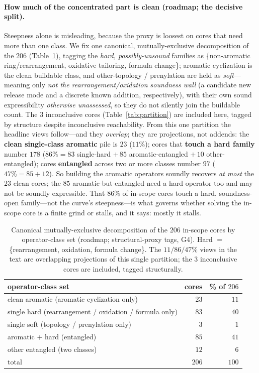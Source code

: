 \documentclass[11pt]{article}
\begin{document}
\paragraph{How much of the concentrated part is clean (roadmap; the decisive split).} Steepness alone
is misleading, because the proxy is loosest on cores that need more than one class. We fix one
canonical, mutually-exclusive decomposition of the $206$ (Table~\ref{tab:mece}), tagging the
\emph{hard, possibly-unsound} families as \{non-aromatic ring/rearrangement, oxidative tailoring,
formula change\}; aromatic cyclization is the clean buildable class, and other-topology / prenylation
are held as \emph{soft}---meaning only \emph{not the rearrangement/oxidation soundness wall} (a
candidate new release mode and a discrete known addition, respectively), with their own sound
expressibility \emph{otherwise unassessed}, so they do not silently join the buildable count. The $3$ inconclusive cores (Table~\ref{tab:partition})
are included here, tagged by structure despite inconclusive reachability. From this one partition the
headline views follow---and they \emph{overlap}; they are projections, not addends: the
\textbf{clean single-class aromatic} pile is $23$ ($11\%$); cores that \textbf{touch a hard family}
number $178$ ($86\%=83$ single-hard $+\,85$ aromatic-entangled $+\,10$ other-entangled); cores
\textbf{entangled} across two or more classes number $97$ ($47\%=85+12$). So building the aromatic
operators soundly recovers \emph{at most} the $23$ clean cores; the $85$ aromatic-but-entangled need a
hard operator too and may not be soundly expressible. That $86\%$ of in-scope cores touch a hard,
soundness-open family---not the curve's steepness---is what governs whether solving the in-scope core
is a finite grind or stalls, and it says: mostly it stalls.

\begin{table}[t]\centering\small
\begin{tabular}{lrr}
\toprule
operator-class set & cores & \% of $206$ \\
\midrule
clean aromatic (aromatic cyclization only)              & $23$  & $11$ \\
single hard (rearrangement / oxidation / formula only)  & $83$  & $40$ \\
single soft (topology / prenylation only)               & $3$   & $1$  \\
aromatic $+$ hard (entangled)                           & $85$  & $41$ \\
other entangled (two classes)                           & $12$  & $6$  \\
\midrule
total                                                   & $206$ & $100$ \\
\bottomrule
\end{tabular}
\caption{Canonical mutually-exclusive decomposition of the $206$ in-scope cores by operator-class set
(roadmap; structural-proxy tags, G4). Hard $=$ \{rearrangement, oxidation, formula change\}. The
$11/86/47\%$ views in the text are overlapping projections of this single partition; the $3$
inconclusive cores are included, tagged structurally.}
\label{tab:mece}
\end{table}
\end{document}
